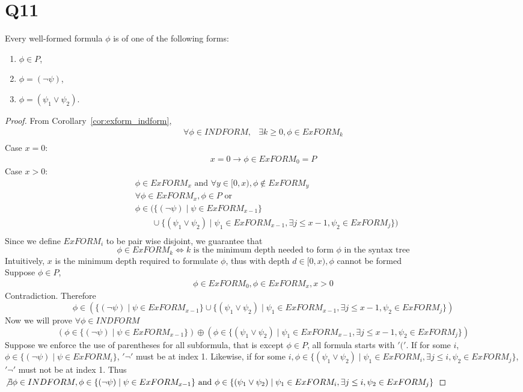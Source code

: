 \documentclass{article}
\newtheorem{lemma}[theorem]{Lemma}
\let\oldlemma\lemma
\let\endoldlemma\endlemma
\renewenvironment{lemma}
  {\begin{tcolorbox}[
      colback=green!8,
      colframe=green!50!black,
      boxrule=0.6pt,
      arc=2pt,
      left=6pt,right=6pt,top=4pt,bottom=4pt
    ]\oldlemma}
  {\endoldlemma\end{tcolorbox}}
\begin{document}
\section*{Q11}
\begin{lemma}
    Every well-formed formula $\phi$ is of one of the following forms:
    \begin{enumerate}
        \item $\phi \in P$,
        \item $\phi = (\neg \psi)$,
        \item $\phi = (\psi_1 \lor \psi_2)$.
    \end{enumerate}
    \end{lemma}
\begin{proof}
From Corollary~\ref{cor:exform_indform}, 
\begin{align*}
    \forall \phi \in INDFORM, &\exists k \geq 0, \phi \in ExFORM_k\\
\end{align*}
Case $x = 0$:
\begin{align*}
    x = 0\rightarrow \phi \in ExFORM_0 = P
\end{align*}
Case $x > 0$: 
\begin{align*}
    &\phi \in ExFORM_x \text{ and } \forall y \in [0,x), \phi \not \in ExFORM_y\\
    &\forall \phi \in ExFORM_x, \phi \in P \text{ or }\\
    &\phi \in (\{(\neg \psi) \mid \psi \in ExFORM_{x-1}\}\\
    &\qquad \cup \{(\psi_1 \lor \psi_2) \mid \psi_1 \in ExFORM_{x-1}, \exists j \leq x-1, \psi_2 \in ExFORM_{j}\})\\
\end{align*}
Since we define $ExFORM_i$ to be pair wise disjoint, we guarantee that 
\[\phi \in ExFORM_k \iff k \text{ is the minimum depth needed to form } \phi \text{ in the syntax tree}\]
Intuitively, $x$ is the minimum depth required to formulate $\phi$, thus with depth $d \in [0,x), \phi$ cannot be formed \\
Suppose $\phi \in P$, 
\begin{align*}
    \phi \in ExFORM_0, \phi \in ExFORM_x ,x > 0
\end{align*}
Contradiction. Therefore 
\[\phi \in (\{(\neg \psi) \mid \psi \in ExFORM_{x-1}\} \cup \{(\psi_1 \lor \psi_2) \mid \psi_1 \in ExFORM_{x-1}, \exists j \leq x-1, \psi_2 \in ExFORM_{j}\})\]
Now we will prove $\forall \phi \in INDFORM$ 
\[(\phi \in \{(\neg \psi) \mid \psi \in ExFORM_{x-1}\}) \oplus (\phi \in \{(\psi_1 \lor \psi_2) \mid \psi_1 \in ExFORM_{x-1}, \exists j \leq x-1, \psi_2 \in ExFORM_{j}\})\]
Suppose we enforce the use of parentheses for all subformula, that is except $\phi \in P$, all formula starts with $'('$. If for some $i$, 
$\phi \in \{(\neg \psi) \mid \psi \in ExFORM_{i}\}$, $'\neg'$ must be at index 1. Likewise, if for some $i, \phi \in \{(\psi_1 \lor \psi_2) \mid \psi_1 \in ExFORM_{i}, \exists j \leq i, \psi_2 \in ExFORM_{j}\}$, 
$'\neg'$ must not be at index 1. Thus $\not \exists \phi \in INDFORM, \phi \in \{(\neg \psi) \mid \psi \in ExFORM_{x-1}\} \text{ and } \phi \in \{(\psi_1 \lor \psi_2) \mid \psi_1 \in ExFORM_{i}, \exists j \leq i, \psi_2 \in ExFORM_{j}\}$
\end{proof}
\end{document}
